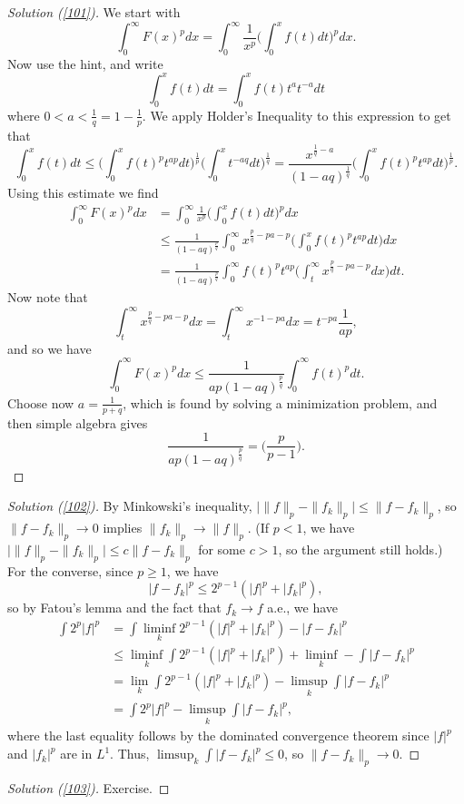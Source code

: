 \documentclass[	DIV=calc,paper=a4,fontsize=11pt]{scrartcl}	 	%
\theoremstyle{definition}
\theoremstyle{plain}
\theoremstyle{remark}
\begin{document}
\begin{proof}[Solution (\ref{101})]
We start with
  \[\int_{0}^{\infty} F(x)^pdx =\int_{0}^{\infty}\frac{1}{x^p}\biggl(\int_0^x f(t)dt\biggl)^p dx.\]
  Now use the hint, and write
  \[\int_0^x f(t)dt =\int_0^x f(t)t^at^{-a}dt\]
  where $0 < a < \frac{1}{q}= 1-\frac{1}{p}$. We apply Holder’s Inequality to this expression to get that
  \[\int_0^x f(t)dt \leq \biggl(\int_0^x f(t)^pt^{ap}dt\biggl)^{\frac{1}{p}}\biggl(\int_0^x t^{-aq}dt\biggl)^{\frac{1}{q}}=\frac{x^{\frac{1}{q}-a}}{(1-aq)^{\frac{1}{q}}}\biggl(\int_0^x f(t)^pt^{ap}dt\biggl)^{\frac{1}{p}}.\]
  Using this estimate we find
  \begin{align*}
  \int_0^{\infty} F(x)^p dx &= \int_0^{\infty} \frac{1}{x^p}\biggl(\int_0^x f(t)dt\biggl)^p dx\\
                             &\leq \frac{1}{(1-aq)^{\frac{p}{q}}}\int_0^{\infty} x^{\frac{p}{q}-pa-p}\biggl(\int_0^x f(t)^pt^{ap}dt\biggl) dx\\
                             &=\frac{1}{(1-aq)^{\frac{p}{q}}}\int_0^{\infty} f(t)^pt^{ap}\biggl(\int_t^{\infty}x^{\frac{p}{q}-pa-p}dx\biggl)dt.
  \end{align*}
  Now note that
  \[\int_t^{\infty} x^{\frac{p}{q}-pa-p}dx =\int_t^{\infty} x^{-1-pa}dx = t^{-pa}\frac{1}{ap},\]
  and so we have
  \[\int_0^{\infty} F(x)^pdx\leq \frac{1}{ap(1-aq)^{\frac{p}{q}}}\int_0^{\infty} f(t)^pdt.\]
  Choose now $a =\frac{1}{p+q}$, which is found by solving a minimization problem, and then simple algebra gives
  \[\frac{1}{ap(1-aq)^{\frac{p}{q}}}= \biggl(\frac{p}{p-1}\biggl).\]
\end{proof}
\begin{proof}[Solution (\ref{102})]
By Minkowski's inequality, $\biggl |\|f\|_p-\|f_k\|_p\biggl |\leq \|f-f_k\|_p$, so $\|f-f_k\|_p\to 0$ implies $\|f_k\|_p\to \|f\|_p$. (If $p < 1$, we have $\biggl | \|f\|_p-\|f_k\|_p\biggl|\leq c\|f-f_k\|_p$ for some $c > 1$, so the argument still holds.) For the converse, since $p\geq 1$, we have
  \[ |f-f_k|^p \leq 2^{p-1} (|f|^p + |f_k|^p),\]
  so by Fatou’s lemma and the fact that $f_k\to f$ a.e., we have
  \begin{align*}
  \int 2^p |f|^p &=\int \liminf_k 2^{p-1} (|f|^p + |f_k|^p)-|f-f_k|^p\\
                 &\leq \liminf_k\int 2^{p-1} (|f|^p + |f_k|^p) + \liminf_k -\int|f- f_k|^p\\
                 &= \lim_k\int 2^{p-1} (|f|^p + |f_k|^p)-\limsup_k\int|f-f_k|^p\\
                 &= \int 2^p |f|^p -\limsup_k\int|f-f_k|^p ,
  \end{align*}
  where the last equality follows by the dominated convergence theorem since $|f|^p$ and $|f_k|^p$ are in $L^1$. Thus, $\limsup_k \int|f-f_k|^p\leq 0$, so $\|f-f_k\|_p\to 0$.
\end{proof}
\begin{proof}[Solution (\ref{103})]
Exercise.
\end{proof}
\end{document}
